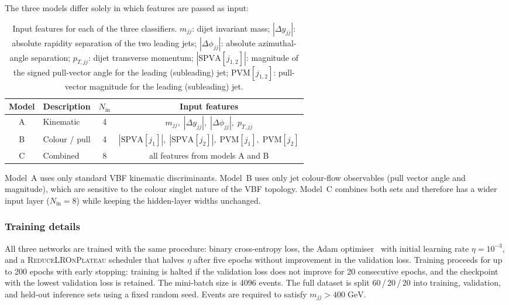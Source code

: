 The three models differ solely in which features are passed as input:
%
\begin{table}[h]
  \centering
  \caption{Input features for each of the three classifiers.
           $m_{jj}$: dijet invariant mass;
           $|\Delta y_{jj}|$: absolute rapidity separation of the two leading jets;
           $|\Delta\phi_{jj}|$: absolute azimuthal-angle separation;
           $p_{T,jj}$: dijet transverse momentum;
           $|\text{SPVA}[j_{1,2}]|$: magnitude of the signed pull-vector angle
           for the leading (subleading) jet;
           $\text{PVM}[j_{1,2}]$: pull-vector magnitude for the
           leading (subleading) jet.}
  \label{tab:nn_features}
  \renewcommand{\arraystretch}{1.25}
  \begin{tabular}{clcc}
    \hline\hline
    Model & Description & $N_\text{in}$ & Input features \\
    \hline
    A & Kinematic & 4 &
      $m_{jj},\;|\Delta y_{jj}|,\;|\Delta\phi_{jj}|,\;p_{T,jj}$ \\
    B & Colour / pull & 4 &
      $|\text{SPVA}[j_1]|,\;|\text{SPVA}[j_2]|,\;\text{PVM}[j_1],\;\text{PVM}[j_2]$ \\
    C & Combined & 8 &
      all features from models A and B \\
    \hline\hline
  \end{tabular}
\end{table}

Model~A uses only standard VBF kinematic discriminants.
Model~B uses only jet colour-flow observables (pull vector angle and magnitude),
which are sensitive to the colour singlet nature of the VBF topology.
Model~C combines both sets and therefore has a wider input layer
($N_\text{in}=8$) while keeping the hidden-layer widths unchanged.

\subsubsection*{Training details}

All three networks are trained with the same procedure:
binary cross-entropy loss, the Adam optimiser~\cite{adam} with initial learning
rate $\eta=10^{-3}$, and a \textsc{ReduceLROnPlateau} scheduler that halves
$\eta$ after five epochs without improvement in the validation loss.
Training proceeds for up to 200 epochs with early stopping: training is halted
if the validation loss does not improve for 20 consecutive epochs, and the
checkpoint with the lowest validation loss is retained.
The mini-batch size is 4096 events.
The full dataset is split 60\,/\,20\,/\,20 into training, validation, and
held-out inference sets using a fixed random seed.
Events are required to satisfy $m_{jj}>400\;\text{GeV}$.

